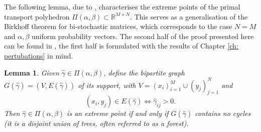 \documentclass[11pt, oneside, titlepage]{book}
\theoremstyle{plain}
\newtheorem{lemma}[theorem]{Lemma}
\theoremstyle{definition}
\newcommand{\R}{\mathbb{R}}
\begin{document}
The following lemma, due to \cite{klee1967facets}, characterises the extreme points of the primal transport polyhedron $\Pi(\alpha, \beta) \subset \R^{M \times N}$. This serves as a generalisation of the Birkhoff theorem for bi-stochastic matrices, which corresponds to the case $N = M$ and $\alpha, \beta$ uniform probability vectors. The second half of the proof presented here can be found in \cite[Chapter 8]{brualdi2006combinatorial}, the first half is formulated with the results of Chapter \ref{ch: pertubations} in mind.
\begin{lemma} \textnormal{\cite{klee1967facets}}
    \label{lemma: characterisation of extreme points of primal polyhedra}
    Given $\hat\gamma \in \Pi(\alpha, \beta)$, define the bipartite graph $G(\hat\gamma) = (V, E(\hat\gamma))$ of its support, with $V = (x_i)_{i=1}^M \cup (y_j)_{j=1}^N$ and
    \begin{equation}
        (x_i, y_j) \in E(\hat\gamma) \iff \hat\gamma_{ij} >0.
    \end{equation}
    Then $\hat\gamma \in \Pi(\alpha, \beta)$ is an extreme point if and only if $G(\hat\gamma)$ contains no cycles (it is a disjoint union of trees, often referred to as a forest).
\end{lemma}
\end{document}
